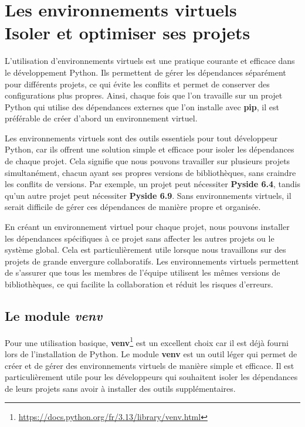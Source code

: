 \chapter[Les environnements virtuels]{Les environnements virtuels \\ Isoler et optimiser ses projets}

\bigskip

L'utilisation d'environnements virtuels est une pratique courante et efficace dans le développement Python. Ils permettent de gérer les dépendances séparément pour différents projets, ce qui évite les conflits et permet de conserver des configurations plus propres. Ainsi, chaque fois que l'on travaille sur un projet Python qui utilise des dépendances externes que l'on installe avec \textbf{pip}, il est préférable de créer d'abord un environnement virtuel.

Les environnements virtuels sont des outils essentiels pour tout développeur Python, car ils offrent une solution simple et efficace pour isoler les dépendances de chaque projet. Cela signifie que nous pouvons travailler sur plusieurs projets simultanément, chacun ayant ses propres versions de bibliothèques, sans craindre les conflits de versions. Par exemple, un projet peut nécessiter \textbf{Pyside 6.4}, tandis qu'un autre projet peut nécessiter \textbf{Pyside 6.9}. Sans environnements virtuels, il serait difficile de gérer ces dépendances de manière propre et organisée.

En créant un environnement virtuel pour chaque projet, nous pouvons installer les dépendances spécifiques à ce projet sans affecter les autres projets ou le système global. Cela est particulièrement utile lorsque nous travaillons sur des projets de grande envergure collaboratifs. Les environnements virtuels permettent de s'assurer que tous les membres de l'équipe utilisent les mêmes versions de bibliothèques, ce qui facilite la collaboration et réduit les risques d'erreurs.

\section{Le module \textit{venv}}
Pour une utilisation basique, \textbf{venv}\footnote{\url{https://docs.python.org/fr/3.13/library/venv.html}} est un excellent choix car il est déjà fourni lors de l'installation de Python. Le module \textbf{venv} est un outil léger qui permet de créer et de gérer des environnements virtuels de manière simple et efficace. Il est particulièrement utile pour les développeurs qui souhaitent isoler les dépendances de leurs projets sans avoir à installer des outils supplémentaires.

